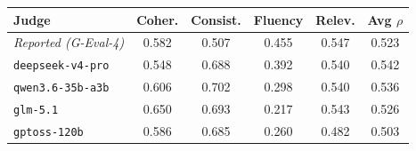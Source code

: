 \begin{tabular}{@{}l cccc c@{}}
\toprule
Judge & Coher. & Consist. & Fluency & Relev. & Avg $\rho$ \\
\midrule
\textit{Reported (G-Eval-4)} & 0.582 & 0.507 & 0.455 & 0.547 & 0.523 \\
\midrule
\texttt{deepseek-v4-pro} & 0.548 & \cellcolor{g!30}0.688 & 0.392 & 0.540 & \cellcolor{g!30}0.542 \\
\texttt{qwen3.6-35b-a3b} & \cellcolor{g!30}0.606 & \cellcolor{g!30}0.702 & 0.298 & 0.540 & \cellcolor{g!30}0.536 \\
\texttt{glm-5.1} & \cellcolor{g!30}0.650 & \cellcolor{g!30}0.693 & 0.217 & 0.543 & \cellcolor{g!30}0.526 \\
\texttt{gptoss-120b} & \cellcolor{g!30}0.586 & \cellcolor{g!30}0.685 & 0.260 & 0.482 & 0.503 \\
\bottomrule
\end{tabular}